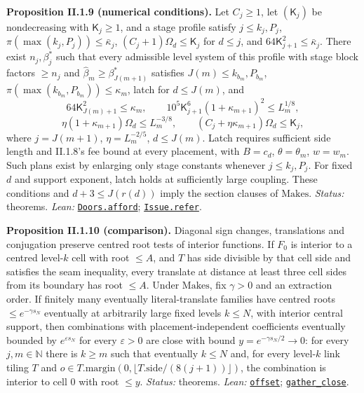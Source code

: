 \documentclass[
  letterpaper,
  11pt]{article}
\begin{document}
\textbf{Proposition II.1.9 (numerical conditions).} Let \(C_j\ge1\), let
\((\mathsf K_j)\) be nondecreasing with \(\mathsf K_j\ge1\), and a stage
profile satisfy \(j\le k_j,P_j\), \(\pi(\max(k_j,P_j))\le\bar\kappa_j\),
\((C_j+1)\Omega_d\le\mathsf K_j\) for \(d\le j\), and
\(64\mathsf K_{j+1}^2\le\bar\kappa_j\). There exist \(n_j,\beta_j^*\)
such that every admissible level system of this profile with stage block
factors \(\ge n_j\) and \(\hat\beta_m\ge\beta^*_{J(m+1)}\) satisfies
\(J(m)\le k_{b_m},P_{b_m}\), \(\pi(\max(k_{b_m},P_{b_m}))\le\kappa_m\),
latch for \(d\le J(m)\), and
\[64\mathsf K_{J(m)+1}^2\le\kappa_m,\qquad10^5\mathsf K_{j+1}^6(1+\kappa_{m+1})^2\le L_m^{1/8},\]
\[\eta(1+\kappa_{m+1})\Omega_d\le L_m^{-3/8},\qquad(C_j+\eta\kappa_{m+1})\Omega_d\le\mathsf K_j,\]
where \(j=J(m+1)\), \(\eta=L_m^{-2/5}\), \(d\le J(m)\). Latch requires
sufficient side length and II.1.8's fee bound at every placement, with
\(B=c_d\), \(\theta=\theta_m\), \(w=w_m\). Such plans exist by enlarging
only stage constants whenever \(j\le k_j,P_j\). For fixed \(d\) and
support exponent, latch holds at sufficiently large coupling. These
conditions and \(d+3\le J(r(d))\) imply the section clauses of
\(\mathrm{Makes}\). \emph{Status:} theorems. \emph{Lean:}
\href{https://github.com/yang-mills-group/OpenAI-YM-20261028/blob/3456e5e75cf8d4cd558955a5c7638fba2d68f464/YM/Extra/SOURCE_HISTORIES/Reserve.lean\#L76-L102}{\texttt{Doors.afford}};
\href{https://github.com/yang-mills-group/OpenAI-YM-20261028/blob/3456e5e75cf8d4cd558955a5c7638fba2d68f464/YM/Extra/SOURCE_HISTORIES/Issue.lean\#L38-L45}{\texttt{Issue.refer}}.

\textbf{Proposition II.1.10 (comparison).} Diagonal sign changes,
translations and conjugation preserve centred root tests of interior
functions. If \(F_0\) is interior to a centred level-\(k\) cell with
root \(\le A\), and \(T\) has side divisible by that cell side and
satisfies the seam inequality, every translate at distance at least
three cell sides from its boundary has root \(\le A\). Under
\(\mathrm{Makes}\), fix \(\gamma>0\) and an extraction order. If
finitely many eventually literal-translate families have centred roots
\(\le e^{-\gamma s_N}\) eventually at arbitrarily large fixed levels
\(k\le N\), with interior central support, then combinations with
placement-independent coefficients eventually bounded by
\(e^{\varepsilon s_N}\) for every \(\varepsilon>0\) are close with bound
\(y=e^{-\gamma s_N/2}\to0\): for every \(j,m\in\mathbb N\) there is
\(k\ge m\) such that eventually \(k\le N\) and, for every level-\(k\)
link tiling \(T\) and
\(o\in T.\mathrm{margin}(0,\lfloor T.\mathrm{side}/(8(j+1))\rfloor)\),
the combination is interior to cell \(0\) with root \(\le y\).
\emph{Status:} theorems. \emph{Lean:}
\href{https://github.com/yang-mills-group/OpenAI-YM-20261028/blob/3456e5e75cf8d4cd558955a5c7638fba2d68f464/YM/Push/RELAY_DIFFERENCE/Placement.lean\#L232-L270}{\texttt{offset}};
\href{https://github.com/yang-mills-group/OpenAI-YM-20261028/blob/3456e5e75cf8d4cd558955a5c7638fba2d68f464/YM/Push/RELAY_DIFFERENCE/Combination.lean\#L65-L93}{\texttt{gather\_close}}.
\end{document}
